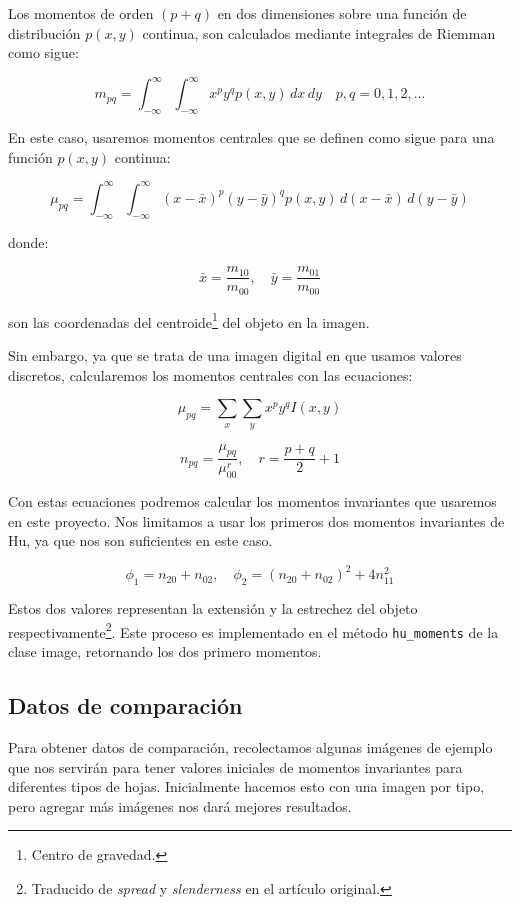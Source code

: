 \documentclass[letter]{article}
\begin{document}
Los momentos de orden \((p+q)\) en dos dimensiones sobre una función de
distribución \(p(x, y)\) continua, son calculados mediante integrales de Riemman
como sigue:

$$ m_{pq} =  \int_{-\infty}^{\infty} \int_{-\infty}^{\infty} x^p y^q p(x, y)\,dx\,dy \quad p, q = 0, 1, 2, ... $$

En este caso, usaremos momentos centrales que se definen como sigue para una
función \(p(x, y)\) continua:

$$ \mu_{pq} = \int_{-\infty}^{\infty} \int_{-\infty}^{\infty} (x-\bar x)^p (y-\bar y)^q p(x, y)\, d(x-\bar x)\,d(y-\bar y) $$

donde:

$$ \bar x = \frac{m_{10}}{m_{00}}, \quad \bar y = \frac{m_{01}}{m_{00}} $$

son las coordenadas del centroide\footnote{Centro de gravedad.} del objeto en la imagen.

Sin embargo, ya que se trata de una imagen digital en que usamos valores
discretos, calcularemos los momentos centrales con las ecuaciones:

$$
\mu_{pq} = \sum_x \sum_y x^p y^q I(x, y)
$$

$$ n_{pq} = \frac{\mu_{pq}}{\mu_{00}^r}, \quad r=\frac{p+q}{2}+1 $$

Con estas ecuaciones podremos calcular los momentos invariantes que usaremos en
este proyecto. Nos limitamos a usar los primeros dos momentos invariantes de Hu,
ya que nos son suficientes en este caso.

$$ \phi_1 = n_{20} + n_{02}, \quad \phi_2 = (n_{20} + n_{02})^2 + 4n_{11}^2 $$

Estos dos valores representan la extensión y la estrechez del objeto
respectivamente\footnote{Traducido de \emph{spread} y \emph{slenderness} en el artículo original.}.
Este proceso es implementado en el método \texttt{hu\_moments} de la clase image,
retornando los dos primero momentos.

\subsection{Datos de comparación}
\label{sec:orgacfcfeb}
Para obtener datos de comparación, recolectamos algunas imágenes de ejemplo que
nos servirán para tener valores iniciales de momentos invariantes para
diferentes tipos de hojas. Inicialmente hacemos esto con una imagen por tipo,
pero agregar más imágenes nos dará mejores resultados.
\end{document}
